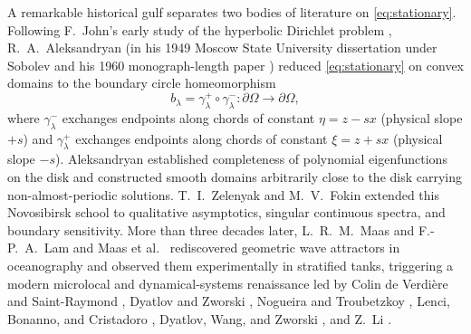\documentclass[11pt,reqno]{amsart}
\theoremstyle{definition}
\theoremstyle{remark}
\begin{document}
A remarkable historical gulf separates two bodies of literature on \eqref{eq:stationary}. Following F.~John's early study of the hyperbolic Dirichlet problem \cite{John1941}, R.~A.~Aleksandryan (in his 1949 Moscow State University dissertation under Sobolev and his 1960 monograph-length paper \cite{Aleksandryan1960}) reduced \eqref{eq:stationary} on convex domains to the boundary circle homeomorphism
\begin{equation}\label{eq:boundary-map}
  b_\lambda = \gamma_\lambda^+ \circ \gamma_\lambda^- \colon \partial\Omega \to \partial\Omega,
\end{equation}
where $\gamma_\lambda^-$ exchanges endpoints along chords of constant $\eta = z - sx$ (physical slope $+s$) and $\gamma_\lambda^+$ exchanges endpoints along chords of constant $\xi = z + sx$ (physical slope $-s$). Aleksandryan established completeness of polynomial eigenfunctions on the disk \cite[\S 9, Thms.~13--14\,bis]{Aleksandryan1960} and constructed smooth domains arbitrarily close to the disk carrying non-almost-periodic solutions. T.~I.~Zelenyak \cite{Zelenyak1965,Zelenyak1970} and M.~V.~Fokin \cite{Fokin1994,Fokin2001,Fokin2002} extended this Novosibirsk school to qualitative asymptotics, singular continuous spectra, and boundary sensitivity. More than three decades later, L.~R.~M.~Maas and F.-P.~A.~Lam \cite{MaasLam1995} and Maas et al.\ \cite{Maas1997} rediscovered geometric wave attractors in oceanography and observed them experimentally in stratified tanks, triggering a modern microlocal and dynamical-systems renaissance led by Colin de Verdi\`ere and Saint-Raymond \cite{CdVSR2020}, Dyatlov and Zworski \cite{DyatlovZworski2019}, Nogueira and Troubetzkoy \cite{NogueiraTroubetzkoy2020}, Lenci, Bonanno, and Cristadoro \cite{LBC2023}, Dyatlov, Wang, and Zworski \cite{DWZ2025}, and Z.~Li \cite{Li2023,Li2024}.
\end{document}
